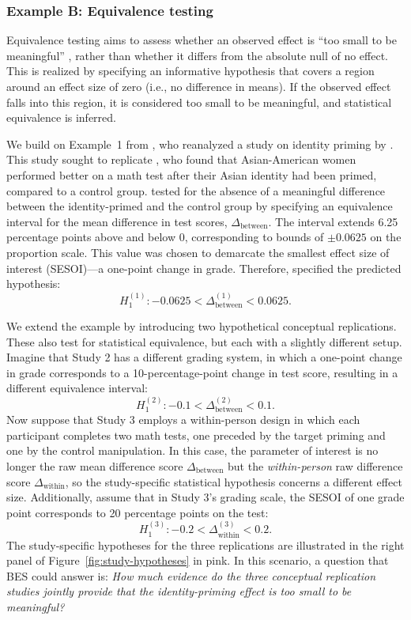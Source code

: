 \documentclass[letterpaper,11pt,oneside]{article}
\begin{document}
\subsubsection{Example B: Equivalence testing}

Equivalence testing aims to assess whether an observed effect is ``too small to be meaningful'' \parencite{lakensImprovingYourStatistical2022}, rather than whether it differs from the absolute null of no effect. This is realized by specifying an informative hypothesis that covers a region around an effect size of zero (i.e., no difference in means). If the observed effect falls into this region, it is considered too small to be meaningful, and statistical equivalence is inferred.

We build on Example~1 from \textcite{scheelEquivalenceTestingPsychological2017}, who reanalyzed a study on identity priming by \textcite{moonSecondaryReplicationAttempt2014}. This study sought to replicate \textcite{shihStereotypeSusceptibilityIdentity1999}, who found that Asian-American women performed better on a math test after their Asian identity had been primed, compared to a control group. \textcite{scheelEquivalenceTestingPsychological2017} tested for the absence of a meaningful difference between the identity-primed and the control group by specifying an equivalence interval for the mean difference in test scores, $\Delta_{\text{between}}$. The interval extends 6.25 percentage points above and below 0, corresponding to bounds of $\pm 0.0625$ on the proportion scale. This value was chosen to demarcate the smallest effect size of interest (SESOI)---a one-point change in grade. Therefore, \textcite{scheelEquivalenceTestingPsychological2017} specified the predicted hypothesis:
    \[
    H_{1}^{(1)}: -0.0625 < \Delta^{(1)}_{\text{between}} < 0.0625.
    \]
    
We extend the example by introducing two hypothetical conceptual replications. These also test for statistical equivalence, but each with a slightly different setup. Imagine that Study 2 has a different grading system, in which a one-point change in grade corresponds to a 10-percentage-point change in test score, resulting in a different equivalence interval:
    \[
    H_{1}^{(2)}: -0.1 < \Delta^{(2)}_{\text{between}} < 0.1.
    \]
Now suppose that Study 3 employs a within-person design in which each participant completes two math tests, one preceded by the target priming and one by the control manipulation. In this case, the parameter of interest is no longer the raw mean difference score $\Delta_\text{between}$ but the \textit{within-person} raw difference score $\Delta_\text{within}$, so the study-specific statistical hypothesis concerns a different effect size. Additionally, assume that in Study 3's grading scale, the SESOI of one grade point corresponds to 20 percentage points on the test:
    \[
    H_{1}^{(3)}: -0.2 < \Delta^{(3)}_{\text{within}} < 0.2.
    \]
The study-specific hypotheses for the three replications are illustrated in the right panel of Figure~\ref{fig:study-hypotheses} in pink. In this scenario, a question that BES could answer is: \textit{How much evidence do the three conceptual replication studies jointly provide that the identity-priming effect is too small to be meaningful?}
\end{document}
